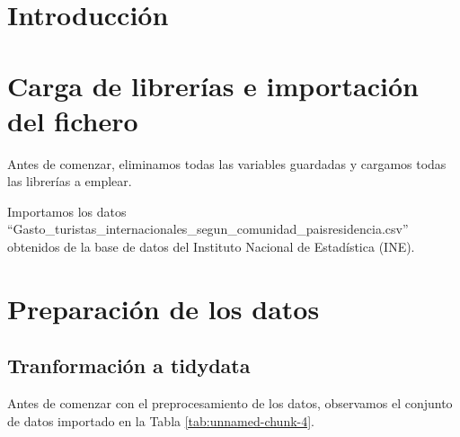\documentclass[data,article,submit,moreauthors,pdftex]{Definitions/mdpi}
\begin{document}

\section{Introducción}\label{introducciuxf3n}

\section{Carga de librerías e importación del
fichero}\label{carga-de-libreruxedas-e-importaciuxf3n-del-fichero}

Antes de comenzar, eliminamos todas las variables guardadas y cargamos
todas las librerías a emplear.

Importamos los datos
``Gasto\_turistas\_internacionales\_segun\_comunidad\_paisresidencia.csv''
obtenidos de la base de datos del Instituto Nacional de Estadística
(INE).

\section{Preparación de los datos}\label{preparaciuxf3n-de-los-datos}

\subsection{Tranformación a tidydata}\label{tranformaciuxf3n-a-tidydata}

Antes de comenzar con el preprocesamiento de los datos, observamos el
conjunto de datos importado en la Tabla \ref{tab:unnamed-chunk-4}.
\end{document}
